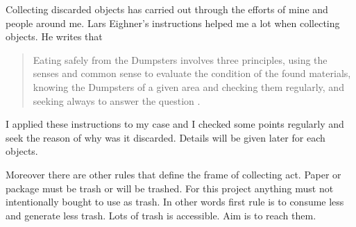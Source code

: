 




Collecting discarded objects has carried out through the efforts of mine and people around me. Lars Eighner's instructions helped me a lot when collecting objects. He writes that 
\begin{quote}
Eating safely from the Dumpsters involves three principles, using the senses and common sense to evaluate the condition of the found materials, knowing the Dumpsters of a given area and checking them regularly, and seeking always to answer the question  \citep[as cited in][6]{strasser1999waste}.
\end{quote}
I applied these instructions to my case and I checked some points regularly and seek the reason of why was it discarded. Details will be given later for each objects. 







Moreover there are other rules that define the frame of collecting act. Paper or package must be trash or will be trashed. For this project anything must not intentionally bought to use as trash. In other words first rule is to consume less and generate less trash. Lots of trash is accessible. Aim is to reach them.

